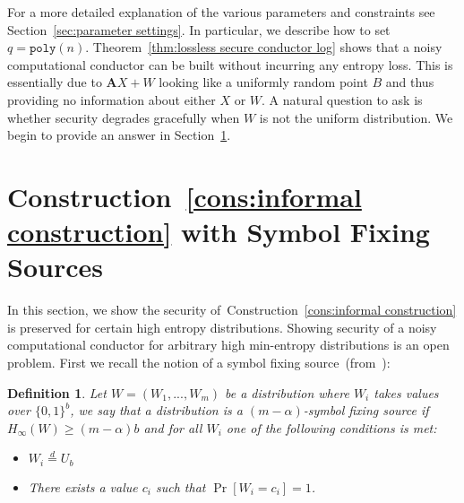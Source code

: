 \documentclass[11pt]{article}
\newcommand{\secref}[1]{\mbox{Section~\ref{#1}}}
\newcommand{\thref}[1]{\mbox{Theorem~\ref{#1}}}
\newcommand{\consref}[1]{\mbox{Construction~\ref{#1}}}
\newcommand{\vect}[1]{\ensuremath{\textbf{#1}}}
\newcommand{\poly}{\ensuremath{\mathtt{poly}}\xspace}
\newtheorem{definition}[theorem]{Definition}
\newcommand{\vA}{\vect{A}}
\begin{document}
For a more detailed explanation of the various parameters and constraints see \secref{sec:parameter settings}.  In particular, we describe how to set $q = \poly(n)$.  
\thref{thm:lossless secure conductor log} shows that a noisy computational conductor can be built without incurring any entropy loss.  This is essentially due to $\vA X+W$ looking like a uniformly random point $B$ and thus providing no information about either $X$ or $W$.  A natural question to ask is whether security degrades gracefully when $W$ is not the uniform distribution.  We begin to provide an answer in \secref{sec:LWE block fixing sources}.  

\section{\consref{cons:informal construction} with Symbol Fixing Sources}
\label{sec:LWE block fixing sources}
In this section, we show the security of~\consref{cons:informal construction} is preserved for certain high entropy distributions.  Showing security of a noisy computational conductor for arbitrary high min-entropy distributions is an open problem.  First we recall the notion of a symbol fixing source~(from~\cite{KZ07}): 
\begin{definition}
Let $W = (W_1,..., W_m)$ be a distribution where $W_i$ takes values over $\{0,1\}^b$, we say that a distribution is a $(m-\alpha)$-\emph{symbol fixing source} if $H_\infty(W)\geq (m - \alpha)b$ and for all $W_i$ one of the following conditions is met:
\begin{itemize}
\item $W_i \overset{d}= U_b$
\item There exists a value $c_i$ such that $\Pr[W_i = c_i] =1$.
\end{itemize}
\end{definition}
\end{document}
